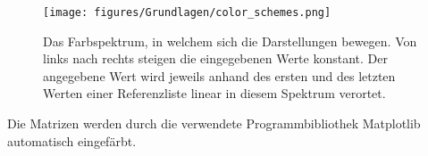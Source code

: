 \begin{figure}[H]
    \centering
    \texttt{[image: figures/Grundlagen/color\_schemes.png]}
    \caption{Das Farbspektrum, in welchem sich die Darstellungen bewegen. Von links nach rechts steigen die eingegebenen Werte konstant. Der angegebene Wert wird jeweils anhand des ersten und des letzten Werten einer Referenzliste linear in diesem Spektrum verortet.}
    \label{fig:color_schemes}
\end{figure}

Die Matrizen werden durch die verwendete Programmbibliothek \glqq{}Matplotlib\grqq{} automatisch eingefärbt.